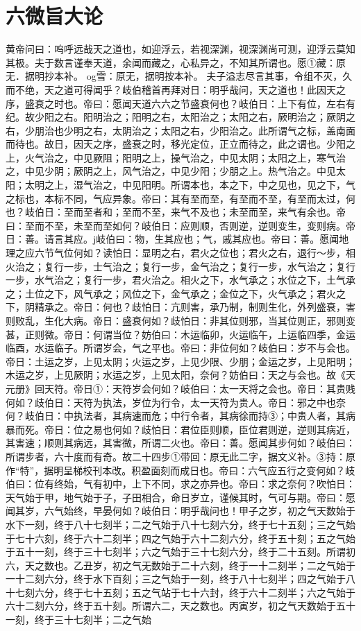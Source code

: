 \documentclass[a4paper,12pt,UTF8,twoside]{ctexbook}
\begin{document}
\chapter{六微旨大论}
黄帝问曰：呜呼远哉天之道也，如迎浮云，若视深渊，视深渊尚可测，迎浮云莫知其极。夫于数言谨奉天道，余闻而藏之，心私异之，不知其所谓也。愿①藏：原无．据明抄本补。
og雪：原无，据明按本补。
夫子溢志尽言其事，令组不灭，久而不绝，天之道可得闻乎？岐伯稽首再拜对日：明乎哉问，天之道也！此因天之序，盛衰之时也。帝曰：愿闻天道六六之节盛衰何也？岐伯日：上下有位，左右有纪。故少阳之右。阳明治之；阳明之右，太阳治之；太阳之右，厥明治之；厥阴之右，少朋治也少明之右，太阴治之；太阳之右，少阳治之。此所谓气之标，盖南面而待也。故日，因天之序，盛衰之时，移光定位，正立而待之，此之谓也。少阳之上，火气治之，中见厥阻；阳明之上，操气治之，中见太阴；太阳之上，寒气治之，中见少阴；厥阴之上，风气治之，中见少阳；少朋之上。热气治之。中见太阳；太明之上，湿气治之，中见阳明。所谓本也，本之下，中之见也，见之下，气之标也，本标不同，气应异象。帝曰：其有至而至，有至而不至，有至而太过，何也？岐伯日：至而至者和；至而不至，来气不及也；未至而至，来气有余也。帝曰：至而不至，未至而至如何？岐伯日：应则顺，否则逆，逆则变生，变则病。帝日：善。请言其应。j岐伯曰：物，生其应也；气，戚其应也。帝曰：善。愿闻地理之应六节气位何如？读怕日：显明之右，君火之位也；君火之右，退行～步，相火治之；复行一步，士气治之；复行一步，金气治之；复行一步，水气治之；复行一步，水气治之；复行一步，君火治之。相火之下，水气承之；水位之下，土气承之；土位之下，风气承之；风位之下，金气承之；金位之下，火气承之；君火之下，阴精承之。帝日：何也？歧怕日：亢则害，承乃制，制则生化，外列盛衰，害则败乱，生化大病。帝日：盛衰何如？歧怕日：非其位则邪，当其位则正，邪则变甚，正则微。帝日：何谓当位？妨伯曰：木运临卯，火运临午，上运临四季，金运临酉，水运临子。所谓岁会，气之平也。帝曰：非位何如？岐伯曰：岁不与会也。帝日：土运之岁，上见太阴；火运之岁，上见少限、少朋；金运之岁，上见阳明；木运之岁，上见厥阴；水运之岁，上见太阳，奈何？妨伯曰：天之与会也。故《天元册》回天符。帝日①：天符岁会何如？岐伯曰：太一天将之会也。帝日：其贵贱何如？歧伯日：天符为执法，岁位为行令，太一天符为贵人。帝日：邪之中也奈何？岐伯日：中执法者，其病速而危；中行令者，其病徐而持③；中贵人者，其病暴而死。帝日：位之易也何如？歧怕日：君位臣则顺，臣位君则逆，逆则其病近，其害速；顺则其病远，其害微，所谓二火也。帝曰：善。愿闻其步何如？岐伯曰：所谓步者，六十度而有奇。故二十四步①带回：原无此二字，据文义补。③持：原作“特”，据明呈梯校刊本改。积盈面刻而成日也。帝曰：六气应五行之变何如？岐伯曰：位有终始，气有初中，上下不同，求之亦异也。帝曰：求之奈何？吹怕日：天气始于甲，地气始于子，子田相合，命日岁立，谨候其时，气可与期。帝曰：愿闻其岁，六气始终，早晏何如？岐伯日：明乎哉问也！甲子之岁，初之气天数始于水下一刻，终于八十七刻半；二之气始于八十七刻六分，终于七十五刻；三之气始于七十六刻，终于六十二刻半；四之气始于六十二刻六分，终于五十刻；五之气始于五十一刻，终于三十七刻半；六之气始于三十七刻六分，终于二十五刻。所谓初六，天之数也。乙丑岁，初之气无数始于二十六刻，终于一十二刻半；二之气始于一十二刻六分，终于水下百刻；三之气始于一刻，终于八十七刻半；四之气始于八十七刻六分，终于七十五刻；五之气站于七十六封，终于六十二刻半；六之气始于六十二刻六分，终于五十刻。所谓六二，天之数也。丙寅岁，初之气天数始于五十一刻，终于三十七刻半；二之气始
\end{document}
